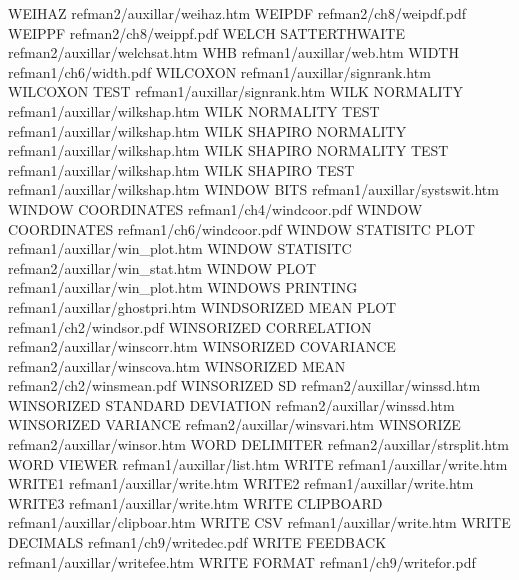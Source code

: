 WEIHAZ                                  refman2/auxillar/weihaz.htm
WEIPDF                                  refman2/ch8/weipdf.pdf
WEIPPF                                  refman2/ch8/weippf.pdf
WELCH SATTERTHWAITE                     refman2/auxillar/welchsat.htm
WHB                                     refman1/auxillar/web.htm
WIDTH                                   refman1/ch6/width.pdf
WILCOXON                                refman1/auxillar/signrank.htm
WILCOXON TEST                           refman1/auxillar/signrank.htm
WILK NORMALITY                          refman1/auxillar/wilkshap.htm
WILK NORMALITY TEST                     refman1/auxillar/wilkshap.htm
WILK SHAPIRO NORMALITY                  refman1/auxillar/wilkshap.htm
WILK SHAPIRO NORMALITY TEST             refman1/auxillar/wilkshap.htm
WILK SHAPIRO TEST                       refman1/auxillar/wilkshap.htm
WINDOW BITS                             refman1/auxillar/systswit.htm
WINDOW COORDINATES                      refman1/ch4/windcoor.pdf
WINDOW COORDINATES                      refman1/ch6/windcoor.pdf
WINDOW STATISITC PLOT                   refman1/auxillar/win_plot.htm
WINDOW STATISITC                        refman2/auxillar/win_stat.htm
WINDOW PLOT                             refman1/auxillar/win_plot.htm
WINDOWS PRINTING                        refman1/auxillar/ghostpri.htm
WINDSORIZED MEAN PLOT                   refman1/ch2/windsor.pdf
WINSORIZED CORRELATION                  refman2/auxillar/winscorr.htm
WINSORIZED COVARIANCE                   refman2/auxillar/winscova.htm
WINSORIZED MEAN                         refman2/ch2/winsmean.pdf
WINSORIZED SD                           refman2/auxillar/winssd.htm
WINSORIZED STANDARD DEVIATION           refman2/auxillar/winssd.htm
WINSORIZED VARIANCE                     refman2/auxillar/winsvari.htm
WINSORIZE                               refman2/auxillar/winsor.htm
WORD DELIMITER                          refman2/auxillar/strsplit.htm
WORD VIEWER                             refman1/auxillar/list.htm
WRITE                                   refman1/auxillar/write.htm
WRITE1                                  refman1/auxillar/write.htm
WRITE2                                  refman1/auxillar/write.htm
WRITE3                                  refman1/auxillar/write.htm
WRITE CLIPBOARD                         refman1/auxillar/clipboar.htm
WRITE CSV                               refman1/auxillar/write.htm
WRITE DECIMALS                          refman1/ch9/writedec.pdf
WRITE FEEDBACK                          refman1/auxillar/writefee.htm
WRITE FORMAT                            refman1/ch9/writefor.pdf

